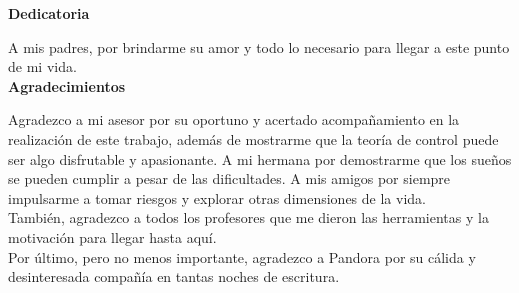 \newpage
    \thispagestyle{empty}
    


\begin{center}
    \textbf{Dedicatoria}%


    
   	A mis padres, por brindarme su amor y todo lo necesario para llegar a este punto de mi vida.\\[2cm]	
   	
    
    \textbf{Agradecimientos}%
    
    Agradezco a mi asesor por su oportuno y acertado acompañamiento en la realización de este trabajo, además de mostrarme que la teoría de control puede ser algo disfrutable y apasionante. A mi hermana por demostrarme que los sueños se pueden cumplir a pesar de las dificultades. A mis amigos por siempre impulsarme a tomar riesgos y explorar otras dimensiones de la vida.\\
      
    También, agradezco a todos los profesores que me dieron las herramientas y la motivación para llegar hasta aquí.\\[1cm]
    Por último, pero no menos importante, agradezco a Pandora por su cálida y desinteresada compañía en tantas noches de escritura.   
\end{center} 




\pagestyle{empty}
\renewcommand{\contentsname}{\centerline{\normalfont\normalsize TABLA DE CONTENIDO}}
    \tableofcontents 
    
    
    
\newpage
     \pagestyle{empty}
    \renewcommand{\listtablename}{\centerline{\normalfont\normalsize LISTA DE TABLAS}}
    \listoftables
    
